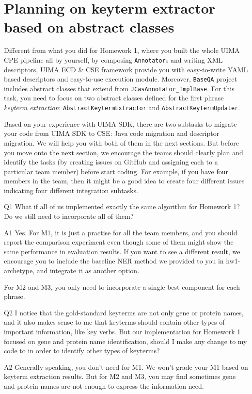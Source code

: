 
\section{Planning on keyterm extractor based on abstract classes}

Different from what you did for Homework 1, where you built the whole UIMA CPE
pipeline all by yourself, by composing \texttt{Annotator}s and writing XML
descriptors, UIMA ECD \& CSE framework provide you with easy-to-write YAML based
descriptors and easy-to-use execution module. Moreover, \texttt{BaseQA} project
includes abstract classes that extend from \verb|JCasAnnotator_ImplBase|. For
this task, you need to focus on two abstract classes defined for the first
phrase \emph{keyterm extraction}: \texttt{AbstractKeytermExtractor} and
\texttt{AbstractKeytermUpdater}.

Based on your experience with UIMA SDK, there are two subtasks to migrate your
code from UIMA SDK to CSE: Java code migration and descriptor migration. We will
help you with both of them in the next sections. But before you move onto the
next section, we encourage the teams should clearly plan and identify the tasks
(by creating issues on GitHub and assigning each to a particular team member)
before start coding. For example, if you have four members in the team, then it
might be a good idea to create four different issues indicating four different
integration subtasks.

\begin{qa}

\item[Q1] What if all of us implemented exactly the same algorithm for Homework
1? Do we still need to incorporate all of them?

\item[A1] Yes. For M1, it is just a practise for all the team members, and you
should report the comparison experiment even though some of them might show the
same performance in evaluation results. If you want to see a different result,
we encourage you to include the baseline NER method we provided to you in
hw1-archetype, and integrate it as another option.

For M2 and M3, you only need to incorporate a single best component for each
phrase.

\item[Q2] I notice that the gold-standard keyterms are not only gene or protein
names, and it also makes sense to me that keyterms should contain other types of
important information, like key verbs. But our implementation for Homework 1
focused on gene and protein name identification, should I make any change to my
code to in order to identify other types of keyterms?

\item[A2] Generally speaking, you don't need for M1. We won't grade your M1
based on keyterm extraction results. But for M2 and M3, you may find sometimes
gene and protein names are not enough to express the information need.

\end{qa}

